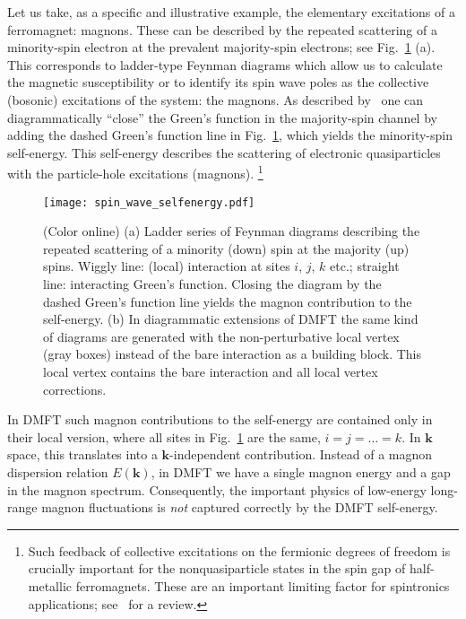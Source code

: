 \documentclass[rmp,aps,reprint,amsmath,amssymb,superscriptaddress,showpacs,nofootinbib]{revtex4-1}
\begin{document}
Let us take, as a specific and illustrative example, the elementary excitations of a ferromagnet: magnons. These can be described by the repeated scattering of a minority-spin electron at the prevalent majority-spin electrons; see Fig.~\ref{Fig:magnon} (a). This corresponds to ladder-type Feynman diagrams which allow us to calculate the magnetic susceptibility or to identify its spin wave poles as the collective (bosonic) excitations of the system: the magnons. As described by~ one can diagrammatically ``close'' the Green's function in the majority-spin channel by adding the dashed Green's function line in  Fig.~\ref{Fig:magnon}, which yields the minority-spin self-energy. This self-energy  describes the scattering of electronic quasiparticles with the particle-hole excitations (magnons). \footnote{Such feedback of collective excitations on the fermionic degrees of freedom is crucially important for the nonquasiparticle states in the spin gap of half-metallic ferromagnets. These are an important limiting factor for  spintronics  applications; see~ for a review.}


\begin{figure}[tb]
  \texttt{[image: spin\_wave\_selfenergy.pdf]}
    \caption{(Color online) (a) Ladder series of Feynman diagrams describing the repeated scattering of a minority (down) spin at the majority (up) spins. 	Wiggly line: (local) interaction at sites $i$, $j$, $k$ etc.; straight line: interacting Green's function. Closing the diagram by the dashed Green's function line yields the magnon  contribution to the self-energy. (b) In diagrammatic extensions of DMFT the same kind of diagrams are generated  with the non-perturbative local vertex (gray boxes) instead of the bare interaction as a building block. This local vertex  contains the bare interaction and all local vertex corrections.}
  \label{Fig:magnon}
\end{figure}

In DMFT such magnon contributions to the self-energy are contained only in their local version, where all sites in  Fig.~\ref{Fig:magnon} are the same,  $i=j=\ldots=k$. In $\mathbf k$ space, this translates into a  $\mathbf k$-independent contribution. Instead of a magnon dispersion relation $E(\mathbf k)$, in DMFT we have  a single magnon energy and a gap in the magnon spectrum. Consequently, the important physics of low-energy  long-range magnon fluctuations is {\sl not} captured correctly by  the DMFT self-energy.
\end{document}
